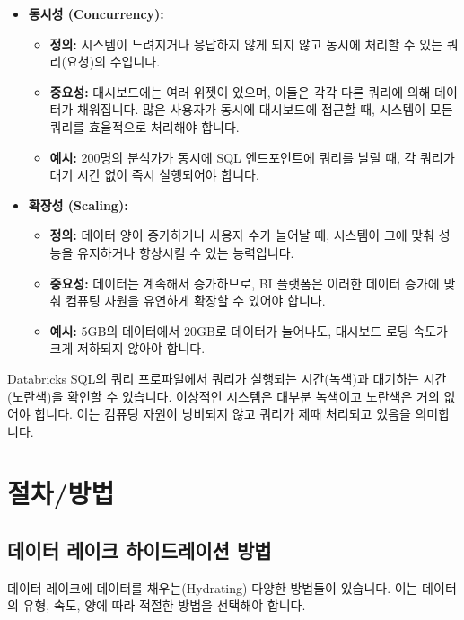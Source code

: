 \documentclass[11pt,a4paper]{article}
\theoremstyle{definition}
\begin{document}
\begin{itemize}
    \item \textbf{동시성 (Concurrency):}
    \begin{itemize}
        \item \textbf{정의:} 시스템이 느려지거나 응답하지 않게 되지 않고 동시에 처리할 수 있는 쿼리(요청)의 수입니다.
        \item \textbf{중요성:} 대시보드에는 여러 위젯이 있으며, 이들은 각각 다른 쿼리에 의해 데이터가 채워집니다. 많은 사용자가 동시에 대시보드에 접근할 때, 시스템이 모든 쿼리를 효율적으로 처리해야 합니다.
        \item \textbf{예시:} 200명의 분석가가 동시에 SQL 엔드포인트에 쿼리를 날릴 때, 각 쿼리가 대기 시간 없이 즉시 실행되어야 합니다.
    \end{itemize}
    \item \textbf{확장성 (Scaling):}
    \begin{itemize}
        \item \textbf{정의:} 데이터 양이 증가하거나 사용자 수가 늘어날 때, 시스템이 그에 맞춰 성능을 유지하거나 향상시킬 수 있는 능력입니다.
        \item \textbf{중요성:} 데이터는 계속해서 증가하므로, BI 플랫폼은 이러한 데이터 증가에 맞춰 컴퓨팅 자원을 유연하게 확장할 수 있어야 합니다.
        \item \textbf{예시:} 5GB의 데이터에서 20GB로 데이터가 늘어나도, 대시보드 로딩 속도가 크게 저하되지 않아야 합니다.
    \end{itemize}
\end{itemize}

\begin{warningbox}[title=쿼리 프로파일의 중요성]
Databricks SQL의 쿼리 프로파일에서 쿼리가 실행되는 시간(녹색)과 대기하는 시간(노란색)을 확인할 수 있습니다. 이상적인 시스템은 대부분 녹색이고 노란색은 거의 없어야 합니다. 이는 컴퓨팅 자원이 낭비되지 않고 쿼리가 제때 처리되고 있음을 의미합니다.
\end{warningbox}

\newpage
\section{절차/방법}

\subsection{데이터 레이크 하이드레이션 방법}
데이터 레이크에 데이터를 채우는(Hydrating) 다양한 방법들이 있습니다. 이는 데이터의 유형, 속도, 양에 따라 적절한 방법을 선택해야 합니다.
\end{document}
